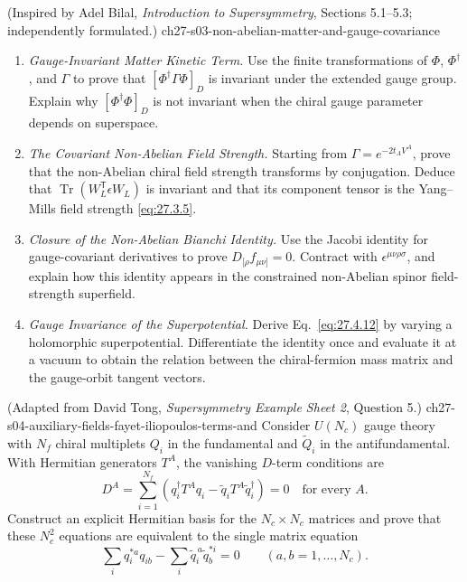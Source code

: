 \begin{enumerate}
    {(Inspired by Adel Bilal, \emph{Introduction to Supersymmetry}, Sections 5.1--5.3; independently formulated.)}
    {ch27-s03-non-abelian-matter-and-gauge-covariance}
  \begin{enumerate}
    \item \emph{Gauge-Invariant Matter Kinetic Term.}
    Use the finite transformations of \(\Phi\), \(\Phi^\dagger\), and
      \(\Gamma\) to prove that
      \([\Phi^\dagger\Gamma\Phi]_D\) is invariant under the extended gauge
      group.  Explain why \([\Phi^\dagger\Phi]_D\) is not invariant when the
      chiral gauge parameter depends on superspace.
    \item \emph{The Covariant Non-Abelian Field Strength.}
    Starting from \(\Gamma=e^{-2t_AV^A}\), prove that the non-Abelian chiral
      field strength transforms by conjugation.  Deduce that
      \(\operatorname{Tr}(W_L^{\mathsf T}\epsilon W_L)\) is invariant and that its
      component tensor is the Yang--Mills field strength
      \eqref{eq:27.3.5}.
    \item \emph{Closure of the Non-Abelian Bianchi Identity.}
    Use the Jacobi identity for gauge-covariant derivatives to prove
      \(D_{[\rho}f_{\mu\nu]}=0\).  Contract with
      \(\epsilon^{\mu\nu\rho\sigma}\), and explain how this identity appears
      in the constrained non-Abelian spinor field-strength superfield.
    \item \emph{Gauge Invariance of the Superpotential.}
    Derive Eq.~\eqref{eq:27.4.12} by varying a holomorphic superpotential.
      Differentiate the identity once and evaluate it at a vacuum to obtain
      the relation between the chiral-fermion mass matrix and the gauge-orbit
      tangent vectors.
  \end{enumerate}

    {(Adapted from David Tong, \emph{Supersymmetry Example Sheet 2}, Question 5.)}
    {ch27-s04-auxiliary-fields-fayet-iliopoulos-terms-and}
Consider \(U(N_c)\) gauge theory with \(N_f\) chiral multiplets
  \(Q_i\) in the fundamental and \(\widetilde Q_i\) in the
  antifundamental.  With Hermitian generators \(T^A\), the vanishing
  \(D\)-term conditions are
  \[
    D^A=\sum_{i=1}^{N_f}
      \left(q_i^\dagger T^Aq_i
       -\widetilde q_iT^A\widetilde q_i^\dagger\right)=0
       \quad\text{for every }A.
  \]
  Construct an explicit Hermitian basis for the \(N_c\times N_c\) matrices
  and prove that these \(N_c^2\) equations are equivalent to the single
  matrix equation
  \[
    \sum_i q_i^{*a}q_{ib}
      -\sum_i\widetilde q_i^{\,a}
              \widetilde q_b^{*i}=0
      \qquad(a,b=1,\ldots,N_c).
  \]


\end{enumerate}
